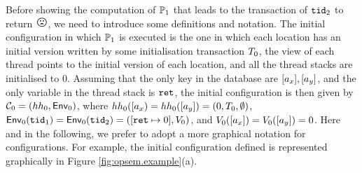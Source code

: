 \documentclass[a4paper,UKenglish]{article}%
\theoremstyle{plain}
\begin{document}
Before showing the computation of $\mathbb{P}_1$ that leads to the transaction of 
$\mathtt{tid}_2$ to return ${\Large \frownie{}}$, we need to introduce some 
definitions and  notation.
The initial configuration in which $\mathbb{P}_1$ is executed is the one in which 
each location has an initial version written by some initialisation transaction $T_0$, 
the view of each thread points to the initial version of each location, and all the  
thread stacks are initialised to $0$. Assuming that the only key in the database 
are $[a_x], [a_y]$, and the only variable in the thread stack is $\texttt{ret}$, 
the initial configuration is then given by $\mathcal{C}_0 = (hh_{0}, \mathsf{Env}_0)$, 
where $hh_{0}([a_{x}) = hh_{0}([a_y]) =  (0, T_0, \emptyset)$,  
$\mathsf{Env}_0(\mathtt{tid}_1) = \mathsf{Env}_0(\mathtt{tid}_2) = ([\texttt{ret} \mapsto 0], V_0)$, 
and $V_0([a_{x}]) = V_0([a_{y}]) = 0$. Here and in the following, we prefer 
to adopt a more graphical notation for configurations. For example, the initial configuration 
defined is represented graphically in Figure \ref{fig:opsem.example}(a). 
%
%
%
%
%
%
%
%
\end{document}
